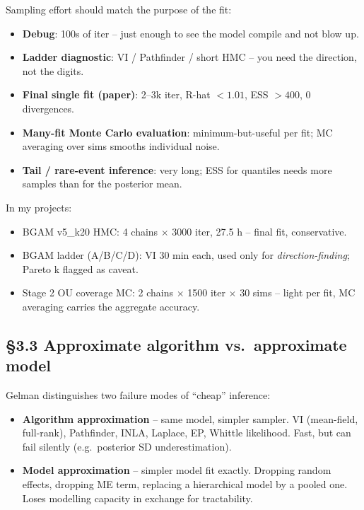 \documentclass[11pt,a4paper]{article}
\begin{document}
Sampling effort should match the purpose of the fit:

\begin{itemize}\setlength{\itemsep}{0pt}
    \item \textbf{Debug}: 100s of iter -- just enough to see the
          model compile and not blow up.
    \item \textbf{Ladder diagnostic}: VI / Pathfinder / short HMC --
          you need the direction, not the digits.
    \item \textbf{Final single fit (paper)}: 2--3k iter, R-hat
          $< 1.01$, ESS $> 400$, 0 divergences.
    \item \textbf{Many-fit Monte Carlo evaluation}: minimum-but-useful
          per fit; MC averaging over sims smooths individual noise.
    \item \textbf{Tail / rare-event inference}: very long; ESS for
          quantiles needs more samples than for the posterior mean.
\end{itemize}

\noindent In my projects:

\begin{itemize}\setlength{\itemsep}{0pt}
    \item BGAM v5\_k20 HMC: 4 chains $\times$ 3000 iter, 27.5 h --
          final fit, conservative.
    \item BGAM ladder (A/B/C/D): VI 30 min each, used only for
          \emph{direction-finding}; Pareto k flagged as caveat.
    \item Stage 2 OU coverage MC: 2 chains $\times$ 1500 iter $\times$
          30 sims -- light per fit, MC averaging carries the
          aggregate accuracy.
\end{itemize}

\subsection*{\S 3.3 Approximate algorithm vs.\ approximate model}

Gelman distinguishes two failure modes of ``cheap'' inference:

\begin{itemize}\setlength{\itemsep}{0pt}
    \item \textbf{Algorithm approximation} -- same model, simpler
          sampler. VI (mean-field, full-rank), Pathfinder, INLA,
          Laplace, EP, Whittle likelihood. Fast, but can fail
          silently (e.g.\ posterior SD underestimation).
    \item \textbf{Model approximation} -- simpler model fit
          exactly. Dropping random effects, dropping ME term,
          replacing a hierarchical model by a pooled one. Loses
          modelling capacity in exchange for tractability.
\end{itemize}
\end{document}
